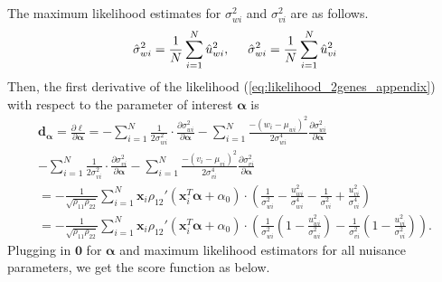 \documentclass[aap,authoryear, preprint]{imsart}
\numberwithin{equation}{section}
\theoremstyle{plain}
\begin{document}

\noindent The maximum likelihood estimates for $\sigma_{wi}^2$ and $\sigma_{vi}^2$ are as follows.
$$\hat{\sigma}_{wi}^2 = \frac{1}{N} \sum_{i=1}^{N} \hat{u}_{wi}^2, \hspace{5mm} 
\hat{\sigma}_{wi}^2 = \frac{1}{N} \sum_{i=1}^{N} \hat{u}_{vi}^2$$
Then, the first derivative of the likelihood (\ref{eq:likelihood_2genes_appendix}) with respect to the parameter of interest $\bm{\alpha}$ is
\begin{equation}
    \begin{multlined}
    \bm{d}_{\bm{\alpha}} = \frac{\partial \ell}{\partial \bm{\alpha}} = - \sum_{i=1}^{N} \frac{1}{2\sigma_{wi}^2} \cdot \frac{\partial \sigma_{wi}^2}{\partial \bm{\alpha}} - \sum_{i=1}^{N} \frac{-(w_i - \mu_{wi})^2}{2\sigma_{wi}^4} \frac{\partial \sigma_{wi}^2}{\partial \bm{\alpha}}\\
    - \sum_{i=1}^{N} \frac{1}{2\sigma_{vi}^2} \cdot \frac{\partial \sigma_{vi}^2}{\partial \bm{\alpha}} - \sum_{i=1}^{N} \frac{-(v_i - \mu_{vi})^2}{2\sigma_{vi}^4} \frac{\partial \sigma_{vi}^2}{\partial \bm{\alpha}}\\
    =-\frac{1}{\sqrt{\rho_{11}\rho_{22}}} \sum_{i=1}^{N} \bm{x}_i \rho_{12}'(\bm{x}_i^T\bm{\alpha} + \alpha_0) \cdot \left(
    \frac{1}{\sigma_{wi}^2} - \frac{u_{wi}^2}{\sigma_{wi}^4} 
    - \frac{1}{\sigma_{vi}^2} + \frac{u_{vi}^2}{\sigma_{vi}^4}
    \right)\\
    = -\frac{1}{\sqrt{\rho_{11}\rho_{22}}} \sum_{i=1}^{N} \bm{x}_i\rho_{12}'(\bm{x}_i^T \bm{\alpha}+\alpha_0) \cdot 
    \left(
    \frac{1}{\sigma_{wi}^2} \left( 1 - \frac{u_{wi}^2}{\sigma_{wi}^2}\right) - 
    \frac{1}{\sigma_{vi}^2} \left( 1 - \frac{u_{vi}^2}{\sigma_{vi}^2} \right)
    \right).
    \end{multlined}
\end{equation}
\noindent Plugging in $\bm{0}$ for $\bm{\alpha}$ and maximum likelihood estimators for all nuisance parameters, we get the score function as below. 
\end{document}
